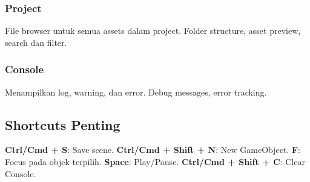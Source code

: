 \subsubsection{Project}
File browser untuk semua assets dalam project. Folder structure, asset preview, search dan filter.

\subsubsection{Console}
Menampilkan log, warning, dan error. Debug messages, error tracking.

\subsection{Shortcuts Penting}

\textbf{Ctrl/Cmd + S}: Save scene. \textbf{Ctrl/Cmd + Shift + N}: New GameObject. \textbf{F}: Focus pada objek terpilih. \textbf{Space}: Play/Pause. \textbf{Ctrl/Cmd + Shift + C}: Clear Console.
